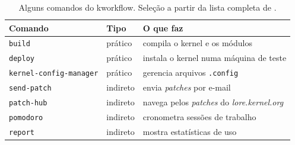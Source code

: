 \begin{table}[htbp]
  \centering
  \caption{Alguns comandos do kworkflow. Seleção a partir da lista completa de
    \citet{tadokoro2025kw}.}
  \label{tab:comandos-kw}
  \begin{tabular}{@{}lll@{}}
    \toprule
    Comando & Tipo & O que faz \\
    \midrule
    \texttt{build}                 & prático  & compila o kernel e os módulos \\
    \texttt{deploy}                & prático  & instala o kernel numa máquina de teste \\
    \texttt{kernel-config-manager} & prático  & gerencia arquivos \texttt{.config} \\
    \texttt{send-patch}            & indireto & envia \textit{patches} por e-mail \\
    \texttt{patch-hub}             & indireto & navega pelos \textit{patches} do \textit{lore.kernel.org} \\
    \texttt{pomodoro}              & indireto & cronometra sessões de trabalho \\
    \texttt{report}                & indireto & mostra estatísticas de uso \\
    \bottomrule
  \end{tabular}
\end{table}
